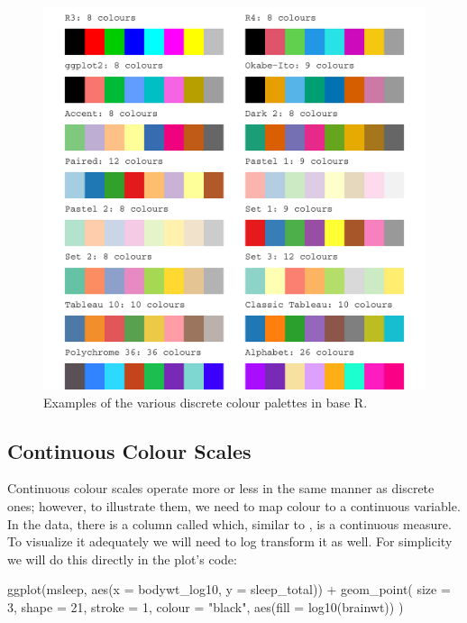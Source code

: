 \begin{figure}[h]
\centering
\includegraphics[scale = .6]{graphics/ch2Figs/palettes.pdf}
\caption{Examples of the various discrete colour palettes in base R.}
\label{fig:discrete_cols}
\end{figure}

\subsection{Continuous Colour Scales}

Continuous colour scales operate more or less in the same manner as discrete ones; however, to illustrate them, we need to map colour to a continuous variable. In the  data, there is a column called  which, similar to , is a continuous measure. To visualize it adequately we will need to log transform it as well. For simplicity we will do this directly in the plot's code:

\begin{inR}
ggplot(msleep, aes(x = bodywt_log10, y = sleep_total)) +
  geom_point(
    size = 3, shape = 21, stroke = 1, colour = "black",
    aes(fill = log10(brainwt))
  )
\end{inR}

\vspace{2em}

